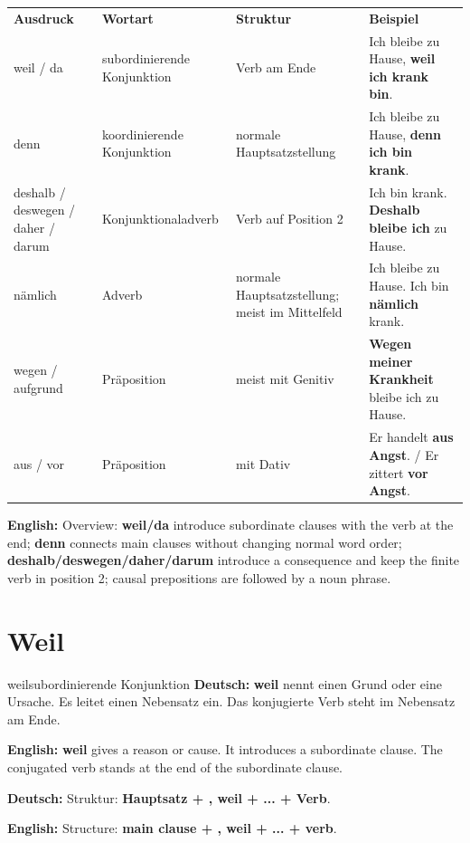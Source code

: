 \documentclass[a4paper,11pt]{article}
\newcommand{\GermanText}[1]{\textbf{Deutsch: }#1\par}
\newcommand{\EnglishText}[1]{{\small\color{SoftGray}\textbf{English: }#1\par}}
\begin{document}
        \begin{longtable}{p{2.5cm}|p{3.0cm}|p{3.7cm}|p{5.6cm}}
            \rowcolor{HeaderBlueDark}
            \color{white}\textbf{Ausdruck} &
            \color{white}\textbf{Wortart} &
            \color{white}\textbf{Struktur} &
            \color{white}\textbf{Beispiel} \\
            weil / da & subordinierende Konjunktion & Verb am Ende & Ich bleibe zu Hause, \textbf{weil ich krank bin}. \\
            denn & koordinierende Konjunktion & normale Hauptsatzstellung & Ich bleibe zu Hause, \textbf{denn ich bin krank}. \\
            deshalb / deswegen / daher / darum & Konjunktionaladverb & Verb auf Position 2 & Ich bin krank. \textbf{Deshalb bleibe ich} zu Hause. \\
            nämlich & Adverb & normale Hauptsatzstellung; meist im Mittelfeld & Ich bleibe zu Hause. Ich bin \textbf{nämlich} krank. \\
            wegen / aufgrund & Präposition & meist mit Genitiv & \textbf{Wegen meiner Krankheit} bleibe ich zu Hause. \\
            aus / vor & Präposition & mit Dativ & Er handelt \textbf{aus Angst}. / Er zittert \textbf{vor Angst}. \\
        \end{longtable}

        \EnglishText{Overview: \textbf{weil/da} introduce subordinate clauses with the verb at the end; \textbf{denn} connects main clauses without changing normal word order; \textbf{deshalb/deswegen/daher/darum} introduce a consequence and keep the finite verb in position 2; causal prepositions are followed by a noun phrase.}

    \section{Weil}

        \begin{grammarentry}{weil}{subordinierende Konjunktion}
            \GermanText{\textbf{weil} nennt einen Grund oder eine Ursache. Es leitet einen Nebensatz ein. Das konjugierte Verb steht im Nebensatz am Ende.}
            \EnglishText{\textbf{weil} gives a reason or cause. It introduces a subordinate clause. The conjugated verb stands at the end of the subordinate clause.}

            \GermanText{Struktur: \textbf{Hauptsatz + , weil + ... + Verb}.}
            \EnglishText{Structure: \textbf{main clause + , weil + ... + verb}.}
        \end{grammarentry}
\end{document}
